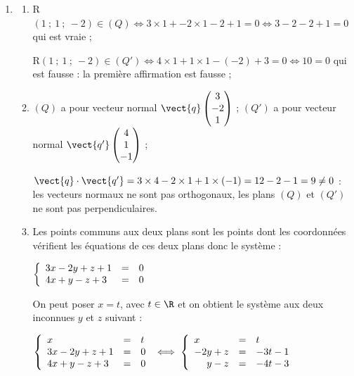 \begin{enumerate}
Ce système n'a pas de solution. Donc le point D n'appartient pas au plan défini par les points A, B et C ou encore A, B, C et D ne sont pas coplanaires.

\item 
	\begin{enumerate}
		\item 
R$(1~;~1~;~-2) \in (Q) \iff 3 \times 1 + -2  \times1  - 2 +1 = 0 \iff 3 - 2 - 2 + 1 = 0$ qui est vraie ;
		
R$(1~;~1~;~-2) \in (Q') \iff 4 \times 1 + 1 \times 1  - (- 2) + 3 = 0 \iff 10 = 0$ qui est fausse : la première affirmation est fausse ;
		\item 
$(Q)$ a pour vecteur normal $\vect{q}\begin{pmatrix}3\\- 2\\1\end{pmatrix}$ ; 
$(Q')$ a pour vecteur normal $\vect{q'}\begin{pmatrix}4\\1\\- 1\end{pmatrix}$ ; 

$\vect{q} \cdot \vect{q'} = 3 \times  4 -2 \times  1 + 1 \times (-1) = 12 - 2 - 1 = 9 \ne 0$ : les vecteurs normaux ne sont pas orthogonaux, les plans $(Q)$ et $(Q')$ ne sont pas perpendiculaires.
		\item 






Les points communs aux deux plans sont les points dont les coordonnées vérifient les équations de ces deux plans donc le système :

$\left\{\begin{array}{l cl}
3x - 2y + z + 1 &=& 0\\
4x + y - z + 3 &=& 0
\end{array}\right.$

On peut poser $x = t$, avec $t \in \R$ et on obtient le système aux deux inconnues $y$ et $z$ suivant :

$\left\{\begin{array}{l cl}
x&=&t\\
3x - 2y + z + 1 &=& 0\\
4x + y - z + 3 &=& 0
\end{array}\right. \iff \left\{\begin{array}{l cl}
x&=&t\\
-2y + z &=& - 3t - 1\\
\phantom{- 2}y - z &=& - 4t - 3
\end{array}\right. $


\end{enumerate}
\end{enumerate}
